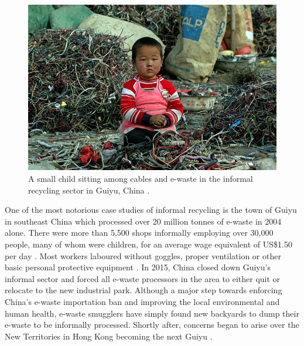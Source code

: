 \documentclass{article}
\newcounter{subsubsubsection}[subsubsection]
\begin{document}
\begin{figure}[h]
    \includegraphics[width=.8 \textwidth]{./images/e-waste_guiyu.png}
    \centering
    \caption{A small child sitting among cables and e-waste in the informal recycling sector in Guiyu, China \cite{greenpeace2005guiyuewaste}.}
    \label{guiyu_e-waste}
\end{figure}

One of the most notorious case studies of informal recycling is the town of Guiyu in southeast China which processed over 20 million tonnes of e-waste in 2004 alone. There were more than 5,500 shops informally employing over 30,000 people, many of whom were children, for an average wage equivalent of US\$1.50 per day \cite{chi2011informal, chan2013review}. Most workers laboured without goggles, proper ventilation or other basic personal protective equipment \cite{sthiannopkao2013handling}. In 2015, China closed down Guiyu's informal sector and forced all e-waste processors in the area to either quit or relocate to the new industrial park. Although a major step towards enforcing China's e-waste importation ban and improving the local environmental and human health, e-waste smugglers have simply found new backyards to dump their e-waste to be informally processed. Shortly after, concerns began to arise over the New Territories in Hong Kong becoming the next Guiyu \cite{ban2018carecyclingexport}.

\label{SECTION_RECYCLE_ENVR_IMPACTS}
\end{document}
